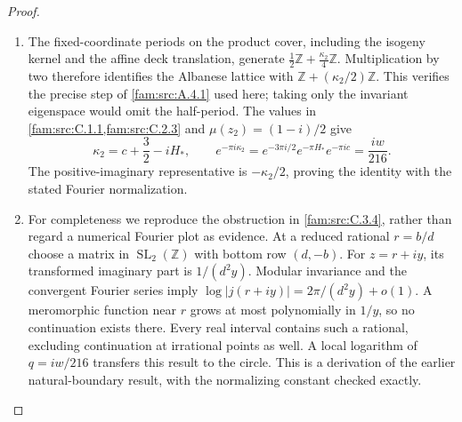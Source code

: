 \begin{proof}
\begin{enumerate}[label=\arabic*.,leftmargin=*]
\item The fixed-coordinate periods on the product cover, including the
isogeny kernel and the affine deck translation, generate
\(\frac12\mathbb Z+\frac{\kappa_2}{4}\mathbb Z\).
Multiplication by two therefore identifies the Albanese lattice with
\(\mathbb Z+(\kappa_2/2)\mathbb Z\). This verifies the precise step of
\cref{fam:src:A.4.1} used here; taking only the invariant eigenspace would omit the
half-period. The values in \cref{fam:src:C.1.1,fam:src:C.2.3} and \(\mu(z_2)=(1-i)/2\) give
\[
 \kappa_2=c+\frac32-iH_*,\qquad
 e^{-\pi i\kappa_2}=e^{-3\pi i/2}e^{-\pi H_*}e^{-\pi ic}
 =\frac{iw}{216}.
\]
The positive-imaginary representative is \(-\kappa_2/2\), proving the
identity with the stated Fourier normalization.

\item For completeness we reproduce the obstruction in \cref{fam:src:C.3.4}, rather than regard a numerical Fourier plot as evidence. At a
reduced rational \(r=b/d\) choose a matrix in
\(\operatorname{SL}_2(\mathbb Z)\) with bottom row \((d,-b)\).
For \(z=r+iy\), its transformed imaginary part is \(1/(d^2y)\).
Modular invariance and the convergent Fourier series imply
\(\log|j(r+iy)|=2\pi/(d^2y)+o(1)\).
A meromorphic function near \(r\) grows at most polynomially in
\(1/y\), so no continuation exists there. Every real interval contains
such a rational, excluding continuation at irrational points as well.
A local logarithm of \(q=iw/216\) transfers this result to the circle.
This is a derivation of the earlier natural-boundary result, with the
normalizing constant checked exactly.
\end{enumerate}
\end{proof}


